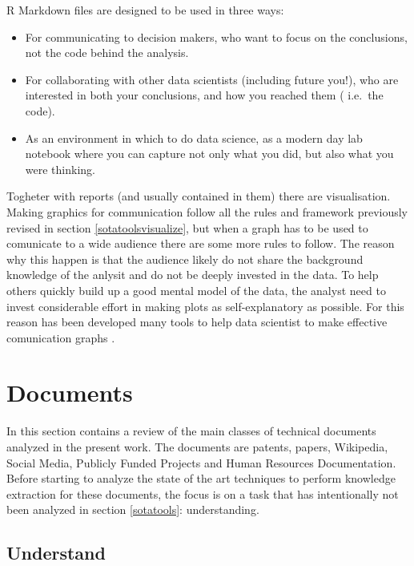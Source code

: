 \documentclass[]{book}
\begin{document}
R Markdown files are designed to be used in three ways:

\begin{itemize}
\item
  For communicating to decision makers, who want to focus on the
  conclusions, not the code behind the analysis.
\item
  For collaborating with other data scientists (including future you!),
  who are interested in both your conclusions, and how you reached them
  ( i.e.~the code).
\item
  As an environment in which to do data science, as a modern day lab
  notebook where you can capture not only what you did, but also what
  you were thinking.
\end{itemize}

Togheter with reports (and usually contained in them) there are
visualisation. Making graphics for communication follow all the rules
and framework previously revised in section \ref{sotatoolsvisualize},
but when a graph has to be used to comunicate to a wide audience there
are some more rules to follow. The reason why this happen is that the
audience likely do not share the background knowledge of the anlysit and
do not be deeply invested in the data. To help others quickly build up a
good mental model of the data, the analyst need to invest considerable
effort in making plots as self-explanatory as possible. For this reason
has been developed many tools to help data scientist to make effective
comunication graphs\citep[\citet{shiny2017}, \citet{plotly2017},
\citet{ggprah2018}, \citet{ICWSM09154}]{wickham2016ggplot2} .

\section{Documents}\label{sotadocuments}

In this section contains a review of the main classes of technical
documents analyzed in the present work. The documents are patents,
papers, Wikipedia, Social Media, Publicly Funded Projects and Human
Resources Documentation. Before starting to analyze the state of the art
techniques to perform knowledge extraction for these documents, the
focus is on a task that has intentionally not been analyzed in section
\ref{sotatools}: understanding.

\subsection{Understand}\label{sotadocumentsunderstand}
\end{document}
